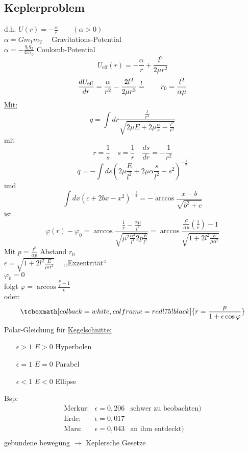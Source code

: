 \documentclass[titlepage,12pt,a4paper,ngerman]{report}
\newcommand{\tx}[1]{\textrm{#1}}
\newcommand{\rmbox}[1]{\tcboxmath[colback=white,colframe=red!75!black]{#1}} %
\renewcommand{\boxed}{\rmbox}
\begin{document}
{\subsection{Keplerproblem}
d.h. $U(r) = - \frac{\alpha}{r} \qquad (\alpha > 0)$\\
$ \alpha = G m_1 m_2 \quad  $  Gravitations-Potential\\
$ \alpha = - \frac{q_1 q_2}{4 \pi \epsilon_0} $ Coulomb-Potential\\
$$U_{\tx{eff}} (r) = -\frac{\alpha}{r} + \frac{l^2}{2 \mu r^2} $$
$$\frac{d U_{\tx{eff}}}{dr} = \frac{\alpha}{r^2} - \frac{2 l^2}{2 \mu r^3} \buildrel ! \over = \qquad r_0 = \frac{l^2}{\alpha \mu}$$
\underline{Mit:}
$$q = \int dr \frac{\frac{l}{r^2}}{\sqrt{2 \mu E + 2 \mu \frac{\alpha}{r} - \frac{l^2}{r^2}}}$$
mit
$$ r = \frac{1}{s} \quad s = \frac{1}{r} \quad \frac{ds}{dr} = - \frac{1}{r^2}$$
$$ q = - \int ds (2\mu \frac{E}{l^2} + 2 \mu \alpha \frac{s}{l^2} - s^2) ^{-\frac{1}{2}}$$
und 
$$ \int dx (c+2bx-x^2)^{-\frac{1}{2}} = - \arccos \frac{x-b}{\sqrt{b^2 + c}}$$
ist
$$ \varphi(r) - \varphi_0 = \arccos \frac{\frac{1}{r} - \frac{\alpha \mu}{l^2}}{\sqrt{\mu^2 \frac{\alpha^2}{l^4} 2 p \frac{E}{l^2}}} = \arccos \frac{\frac{l^2}{\alpha \mu} (\frac{1}{r}) - 1}{\sqrt{1+2l^2 \frac{E}{\mu \alpha^2}}}$$
Mit $ p = \frac{l^2}{\alpha p} $ Abstand $ r_0 $\\
$ \epsilon = \sqrt{1 + 2l^2 \frac{E}{\mu \alpha^2}} \quad$ ,,Exzentrität``\\
$ \varphi_0 = 0 $\\
folgt $  \varphi = \arccos\frac{\frac{p}{r}-1}{\epsilon} $\\
oder:
$$\boxed{ r = \frac{p}{1 + \epsilon \cos \varphi}}$$
Polar-Gleichung für \underline{Kegelschnitte:}
\begin{itemize}
	\item[$ \epsilon > 1 $] $ E>0 $ Hyperbolen
	\item[$ \epsilon = 1 $] $ E = 0 $ Parabel
	\item[$ \epsilon < 1 $] $ E<0 $ Ellipse
\end{itemize}
Bsp:
$$\begin{array}{lll}
\tx{Merkur:} &  \epsilon = 0,206  & \tx{schwer zu beobachten)}\\
\tx{Erde:} & \epsilon = 0,017 \\
\tx{Mars:} & \epsilon = 0,043 & \tx{an ihm entdeckt)}\\
\end{array}$$
gebundene bewegung $ \rightarrow $ Keplersche Gesetze
\begin{itemize}

\end{itemize}}
\end{document}
